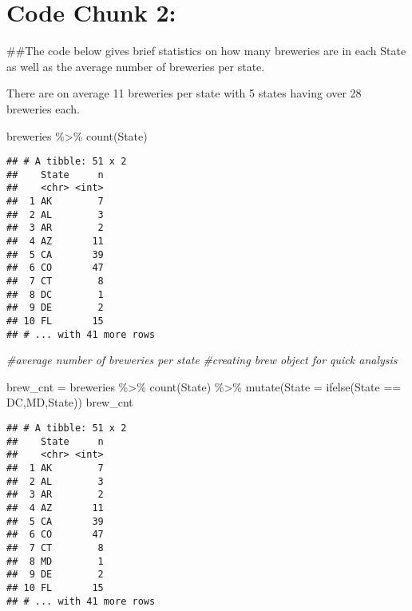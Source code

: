 \documentclass[
]{article}
\newenvironment{Shaded}{\begin{snugshade}}{\end{snugshade}}
\newcommand{\AttributeTok}[1]{\textcolor[rgb]{0.77,0.63,0.00}{#1}}
\newcommand{\CommentTok}[1]{\textcolor[rgb]{0.56,0.35,0.01}{\textit{#1}}}
\newcommand{\FunctionTok}[1]{\textcolor[rgb]{0.00,0.00,0.00}{#1}}
\newcommand{\NormalTok}[1]{#1}
\newcommand{\OtherTok}[1]{\textcolor[rgb]{0.56,0.35,0.01}{#1}}
\newcommand{\SpecialCharTok}[1]{\textcolor[rgb]{0.00,0.00,0.00}{#1}}
\newcommand{\StringTok}[1]{\textcolor[rgb]{0.31,0.60,0.02}{#1}}
\begin{document}
\hypertarget{code-chunk-2}{%
\section{Code Chunk 2:}\label{code-chunk-2}}

\#\#The code below gives brief statistics on how many breweries are in
each State as well as the average number of breweries per state.

There are on average 11 breweries per state with 5 states having over 28
breweries each.

\begin{Shaded}
\begin{Highlighting}[]
\NormalTok{breweries }\SpecialCharTok{\%\textgreater{}\%} \FunctionTok{count}\NormalTok{(State)}
\end{Highlighting}
\end{Shaded}

\begin{verbatim}
## # A tibble: 51 x 2
##    State     n
##    <chr> <int>
##  1 AK        7
##  2 AL        3
##  3 AR        2
##  4 AZ       11
##  5 CA       39
##  6 CO       47
##  7 CT        8
##  8 DC        1
##  9 DE        2
## 10 FL       15
## # ... with 41 more rows
\end{verbatim}

\begin{Shaded}
\begin{Highlighting}[]
\CommentTok{\#average number of breweries per state}
\CommentTok{\#creating brew object for quick analysis}

\NormalTok{brew\_cnt }\OtherTok{=}\NormalTok{ breweries }\SpecialCharTok{\%\textgreater{}\%}
   \FunctionTok{count}\NormalTok{(State) }\SpecialCharTok{\%\textgreater{}\%}
   \FunctionTok{mutate}\NormalTok{(}\AttributeTok{State =} \FunctionTok{ifelse}\NormalTok{(State }\SpecialCharTok{==} \StringTok{\textquotesingle{}DC\textquotesingle{}}\NormalTok{,}\StringTok{\textquotesingle{}MD\textquotesingle{}}\NormalTok{,State))}
\NormalTok{brew\_cnt}
\end{Highlighting}
\end{Shaded}

\begin{verbatim}
## # A tibble: 51 x 2
##    State     n
##    <chr> <int>
##  1 AK        7
##  2 AL        3
##  3 AR        2
##  4 AZ       11
##  5 CA       39
##  6 CO       47
##  7 CT        8
##  8 MD        1
##  9 DE        2
## 10 FL       15
## # ... with 41 more rows
\end{verbatim}
\end{document}
